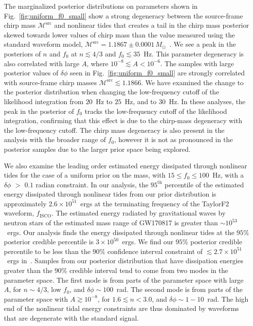 The marginalized posterior distributions on parameters shown in Fig.~\ref{fig:uniform_f0_small} show a strong degeneracy between the source-frame chirp mass $\mathcal{M}^\textrm{src}$ and nonlinear tides that creates a tail in the chirp mass posterior skewed towards lower values of chirp mass than the value measured using the standard waveform model, $\mathcal{M}^\textrm{src} = 1.1867\pm0.0001\, M_\odot$~\citep{de2018tidal}. We see a peak in the posteriors of $n$ and $f_0$ at $n \lesssim 4/3$ and $f_0 \lesssim 35$~Hz. This parameter degeneracy is also correlated with large $A$, where $10^{-8} \lesssim A < 10^{-6}$. The samples with large posterior values of $\delta\phi$ seen in Fig.~\ref{fig:uniform_f0_small} are strongly correlated with source-frame chirp masses $\mathcal{M}^\textrm{src} \lesssim 1.1866.$ We have examined the change to the posterior distribution when changing the low-frequency cutoff of the likelihood integration from $20$~Hz to $25$~Hz, and to $30$~Hz. In these analyses, the peak in the posterior of $f_0$ tracks the low-frequency cutoff of the likelihood integration, confirming that this effect is due to the chirp-mass degeneracy with the low-frequency cutoff. The chirp mass degeneracy is also present in the analysis with the broader range of $f_0$, however it is not as pronounced in the posterior samples due to the larger prior space being explored.

We also examine the leading order estimated energy dissipated through nonlinear tides for the case of a uniform prior on the mass, with $15 \leq f_0 \leq 100$~Hz, with a $\delta \phi$ $>$ $0.1$ radian constraint. In our analysis, the $95^{\mathrm{th}}$ percentile of the estimated energy dissipated through nonlinear tides from our prior distribution is approximately $2.6 \times 10^{51}$~ergs at the terminating frequency of the TaylorF2 waveform, $f_\mathrm{ISCO}$. The estimated energy radiated by gravitational waves by neutron stars of the estimated mass range of GW170817 is greater than $\sim 10^{53}$~ergs. Our analysis finds the energy dissipated through nonlinear tides at the $95\%$ posterior credible percentile is $3 \times 10^{50}$~ergs. We find our $95\%$ posterior credible percentile to be less than the $90\%$ confidence interval constraint of $\lesssim 2.7 \times 10^{51}$~ergs in~\cite{abbott2019constraining}. Samples from our posterior distribution that have dissipation energies greater than the $90$\% credible interval tend to come from two modes in the parameter space. The first mode is from parts of the parameter space with large $A$, for $n \sim 4/3$, low $f_0$, and $\delta \phi \sim 100$~rad. The second mode is from parts of the parameter space with $A \gtrsim 10^{-8}$, for $1.6 \lesssim n < 3.0$, and $\delta \phi \sim 1-10$~rad. The high end of the nonlinear tidal energy constraints are thus dominated by waveforms that are degenerate with the standard signal.

